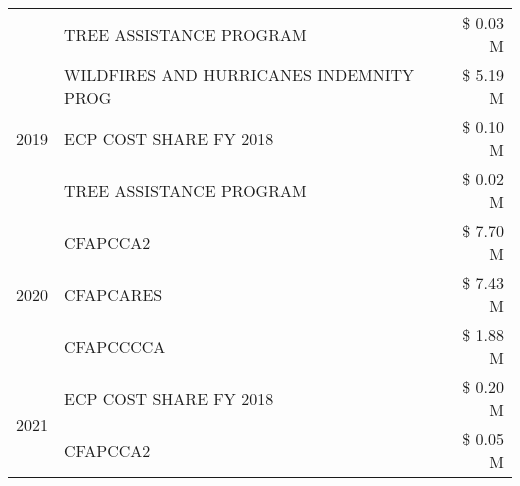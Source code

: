 \begin{tabular}{llr}
 & TREE ASSISTANCE PROGRAM & \$ 0.03 M \\
\cline{1-3}
\multirow[t]{3}{*}{2019} & WILDFIRES AND HURRICANES INDEMNITY PROG & \$ 5.19 M \\
 & ECP COST SHARE FY 2018 & \$ 0.10 M \\
 & TREE ASSISTANCE PROGRAM & \$ 0.02 M \\
\cline{1-3}
\multirow[t]{3}{*}{2020} & CFAPCCA2 & \$ 7.70 M \\
 & CFAPCARES & \$ 7.43 M \\
 & CFAPCCCCA & \$ 1.88 M \\
\cline{1-3}
\multirow[t]{2}{*}{2021} & ECP COST SHARE FY 2018 & \$ 0.20 M \\
 & CFAPCCA2 & \$ 0.05 M \\
\cline{1-3}
\bottomrule
\end{tabular}
